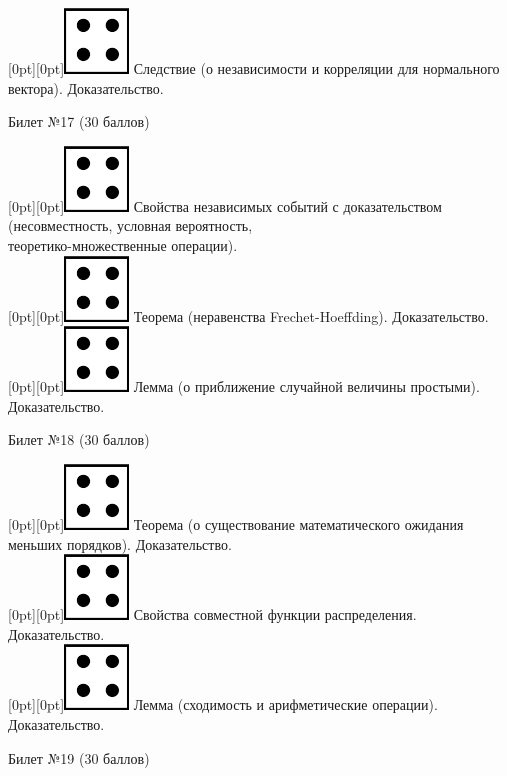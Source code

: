 \documentclass[preview]{standalone}
\begin{document}
\raisebox{-1pt}[0pt][0pt]{\includegraphics[width=0.02\linewidth]{4.png}} Следствие (о независимости и корреляции для нормального вектора). Доказательство. \\
\begin{center} {\Large Билет №17 (30 баллов)} \end{center}
\raisebox{-1pt}[0pt][0pt]{\includegraphics[width=0.02\linewidth]{4.png}} Свойства независимых событий с доказательством (несовместность, условная вероятность, \\ теоретико-множественные операции). \\
\raisebox{-1pt}[0pt][0pt]{\includegraphics[width=0.02\linewidth]{4.png}} Теорема (неравенства Frechet-Hoeffding). Доказательство. \\
\raisebox{-1pt}[0pt][0pt]{\includegraphics[width=0.02\linewidth]{4.png}} Лемма (о приближение случайной величины простыми). Доказательство. \\
\begin{center} {\Large Билет №18 (30 баллов)} \end{center}
\raisebox{-1pt}[0pt][0pt]{\includegraphics[width=0.02\linewidth]{4.png}} Теорема (о существование математического ожидания меньших порядков). Доказательство. \\
\raisebox{-1pt}[0pt][0pt]{\includegraphics[width=0.02\linewidth]{4.png}} Свойства совместной функции распределения. Доказательство. \\
\raisebox{-1pt}[0pt][0pt]{\includegraphics[width=0.02\linewidth]{4.png}} Лемма (сходимость и арифметические операции). Доказательство. \\
\begin{center} {\Large Билет №19 (30 баллов)} \end{center}
\end{document}
